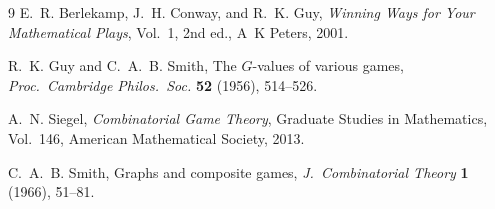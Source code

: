 \documentclass[11pt]{article}
\theoremstyle{definition}
\theoremstyle{remark}
\begin{document}
\begin{thebibliography}{9}
E.~R. Berlekamp, J.~H. Conway, and R.~K. Guy,
\emph{Winning Ways for Your Mathematical Plays}, Vol.~1, 2nd ed., A~K Peters, 2001.

R.~K. Guy and C.~A.~B. Smith,
The $G$-values of various games,
\emph{Proc.\ Cambridge Philos.\ Soc.} \textbf{52} (1956), 514--526.

A.~N. Siegel,
\emph{Combinatorial Game Theory},
Graduate Studies in Mathematics, Vol.~146, American Mathematical Society, 2013.

C.~A.~B. Smith,
Graphs and composite games,
\emph{J.~Combinatorial Theory} \textbf{1} (1966), 51--81.
\end{thebibliography}
\end{document}
